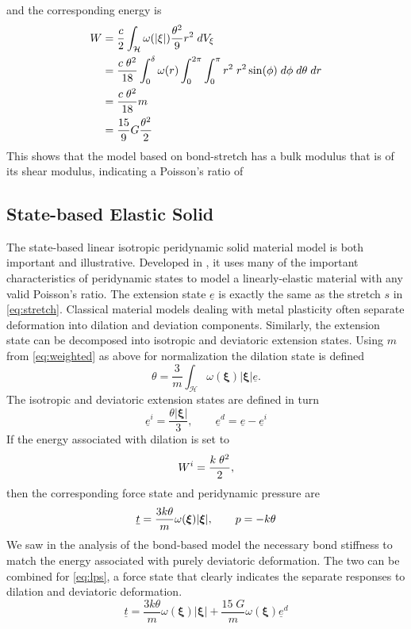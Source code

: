 and the corresponding energy is 
\begin{align}
W &= \frac{c}{2}\int_\mathcal{H} \omega(|\xi|)\frac{\theta^2}{9} r^2 \;dV_\xi\notag\\
&=\frac{c\;\theta^2}{18} \int_0^\delta \omega(r)\int_0^{2\pi}\int_0^\pi r^2\;r^2 \sin(\phi)\;d\phi\;d\theta\;dr \notag\\
&= \frac{c\;\theta^2}{18} m \notag\\
&= \frac{15}{9}G\frac{\theta^2}{2}
\end{align}
This shows that the model based on bond-stretch has a bulk modulus that is  of its shear modulus, indicating a Poisson's ratio of 

\subsection{State-based Elastic Solid}
The state-based linear isotropic peridynamic solid material model is both important and illustrative.
Developed in \cite{silling2007peridynamic}, it uses many of the important characteristics of peridynamic states to model a linearly-elastic material with any valid Poisson's ratio.
The extension state $\underline{e}$ is exactly the same as the stretch $s$ in \cref{eq:stretch}.
Classical material models dealing with metal plasticity often separate deformation into dilation and deviation components.
Similarly, the extension state can be decomposed into isotropic and deviatoric extension states. Using $m$ from \cref{eq:weighted} as above for normalization the dilation state is defined
\begin{equation}
\theta = \frac{3}{m} \int_\mathcal{H} \omega(\boldsymbol{\xi}) |\boldsymbol{\xi}| \underline{e}.
\end{equation}
The isotropic and deviatoric extension states are defined in turn
\begin{equation}
\underline{e}^i = \frac{\theta |\boldsymbol{\xi}|}{3},\qquad \underline{e}^d = \underline{e}-\underline{e}^i
\end{equation}
If the energy associated with dilation is set to
\begin{equation}
W^i = \frac{k\;\theta^2}{2},\notag
\end{equation}
then the corresponding force state and peridynamic pressure are
\begin{equation}
\underline{t} = \frac{3k\theta}{m}\omega(\boldsymbol{\xi})|\boldsymbol{\xi}|,\qquad p=-k\theta\notag
\end{equation}
We saw in the analysis of the bond-based model the necessary bond stiffness to match the energy associated with purely deviatoric deformation.
The two can be combined for \cref{eq:lps}, a force state that clearly indicates the separate responses to dilation and deviatoric deformation.
\begin{equation}
\label{eq:lps}
\underline{t} = \frac{3k\theta}{m}\omega(\boldsymbol{\xi})|\boldsymbol{\xi}| + \frac{15\;G}{m}\omega(\boldsymbol{\xi})\underline{e}^d
\end{equation}

